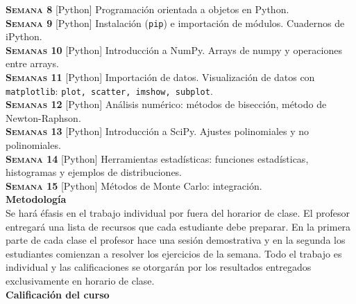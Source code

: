 \documentclass[letterpaper,10pt,onecolumn]{article}
\begin{document}
\noindent\textbf{\textsc{Semana 8}} [Python] Programaci\'on orientada
a objetos en Python.\\[-0.3cm]  

\noindent\textbf{\textsc{Semana 9}} [Python] Instalación (\verb+pip+) e
importación de módulos. Cuadernos de iPython.\\[-0.3cm]  

\noindent\textbf{\textsc{Semanas 10}} [Python] Introducción a
NumPy. Arrays de numpy y operaciones entre arrays. \\[-0.3cm]  

\noindent\textbf{\textsc{Semanas 11}} [Python] Importación de datos. Visualización de datos con
\verb+matplotlib+: \verb+plot, scatter, imshow, subplot+.\\[-0.3cm]  

\noindent\textbf{\textsc{Semanas 12}} [Python] Análisis numérico:
métodos de bisección, método de Newton-Raphson. \\[-0.3cm]  

\noindent\textbf{\textsc{Semanas 13}} [Python] Introducción a
SciPy. Ajustes polinomiales y no polinomiales.\\[-0.3cm]  

\noindent\textbf{\textsc{Semana 14}} [Python] Herramientas
estadísticas: funciones estadísticas, histogramas y ejemplos de
distribuciones.\\[-0.3cm] 

\noindent\textbf{\textsc{Semana 15}} [Python] Métodos de Monte Carlo:
integración.\\[-0.3cm] 

\noindent\textbf{\large {} \quad Metodología}\\[-0.2cm]

\noindent\normalsize Se har\'a \'efasis en el trabajo individual por
fuera del horarior de clase. El profesor entregar\'a una lista de
recursos que cada estudiante debe preparar. 
En la primera parte de cada clase el profesor
hace una sesi\'on demostrativa y en la segunda los
estudiantes comienzan a resolver los ejercicios de la semana. 
Todo el trabajo es individual y las calificaciones se otorgar\'an por
los resultados entregados exclusivamente en horario de clase.
\\[0.1cm] 



\noindent\textbf{\large {} \quad Calificaci\'on del curso}\\[-0.2cm]
\end{document}

